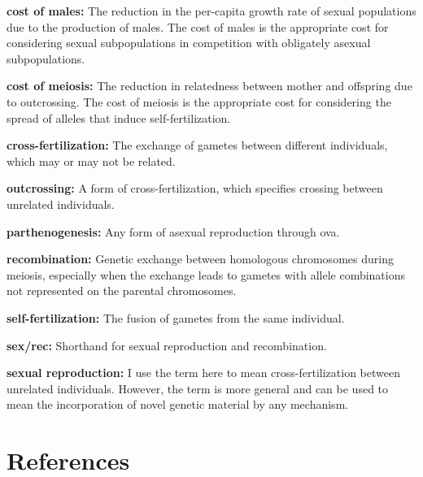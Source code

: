 \documentclass[
  letterpaper,
]{book}
\begin{document}
\textbf{cost of males:} The reduction in the per-capita growth rate of
sexual populations due to the production of males. The cost of males is
the appropriate cost for considering sexual subpopulations in
competition with obligately asexual subpopulations.

\textbf{cost of meiosis:} The reduction in relatedness between mother
and offspring due to outcrossing. The cost of meiosis is the appropriate
cost for considering the spread of alleles that induce
self-fertilization.

\textbf{cross-fertilization:} The exchange of gametes between different
individuals, which may or may not be related.

\textbf{outcrossing:} A form of cross-fertilization, which specifies
crossing between unrelated individuals.

\textbf{parthenogenesis:} Any form of asexual reproduction through ova.

\textbf{recombination:} Genetic exchange between homologous chromosomes
during meiosis, especially when the exchange leads to gametes with
allele combinations not represented on the parental chromosomes.

\textbf{self-fertilization:} The fusion of gametes from the same
individual.

\textbf{sex/rec:} Shorthand for sexual reproduction and recombination.

\textbf{sexual reproduction:} I use the term here to mean
cross-fertilization between unrelated individuals. However, the term is
more general and can be used to mean the incorporation of novel genetic
material by any mechanism.


\chapter*{References}\label{references}

\end{document}
